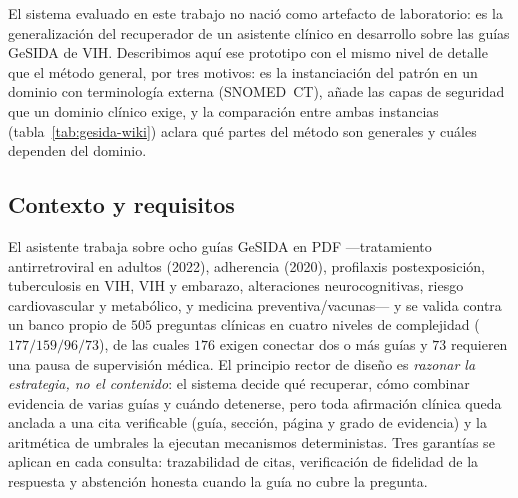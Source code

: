 \documentclass[11pt,a4paper]{article}
\begin{document}
El sistema evaluado en este trabajo no nació como artefacto de laboratorio:
es la generalización del recuperador de un asistente clínico en desarrollo
sobre las guías GeSIDA de VIH. Describimos aquí ese prototipo con el mismo
nivel de detalle que el método general, por tres motivos: es la
instanciación del patrón en un dominio con terminología externa
(SNOMED~CT), añade las capas de seguridad que un dominio clínico exige, y
la comparación entre ambas instancias (tabla~\ref{tab:gesida-wiki}) aclara
qué partes del método son generales y cuáles dependen del dominio.

\subsection{Contexto y requisitos}

El asistente trabaja sobre ocho guías GeSIDA en PDF ---tratamiento
antirretroviral en adultos (2022), adherencia (2020), profilaxis
postexposición, tuberculosis en VIH, VIH y embarazo, alteraciones
neurocognitivas, riesgo cardiovascular y metabólico, y medicina
preventiva/vacunas--- y se valida contra un banco propio de $505$ preguntas
clínicas en cuatro niveles de complejidad ($177/159/96/73$), de las cuales
$176$ exigen conectar dos o más guías y $73$ requieren una pausa de
supervisión médica. El principio rector de diseño es \emph{razonar la
estrategia, no el contenido}: el sistema decide qué recuperar, cómo
combinar evidencia de varias guías y cuándo detenerse, pero toda afirmación
clínica queda anclada a una cita verificable (guía, sección, página y grado
de evidencia) y la aritmética de umbrales la ejecutan mecanismos
deterministas. Tres garantías se aplican en cada consulta: trazabilidad de
citas, verificación de fidelidad de la respuesta y abstención honesta
cuando la guía no cubre la pregunta.
\end{document}
